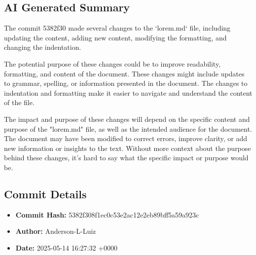 \documentclass{article}
\begin{document}
\subsection{AI Generated Summary}
{\selectfont
 The commit 5382f30 made several changes to the `lorem.md` file, including updating the content, adding new content, modifying the formatting, and changing the indentation.

The potential purpose of these changes could be to improve readability, formatting, and content of the document. These changes might include updates to grammar, spelling, or information presented in the document. The changes to indentation and formatting make it easier to navigate and understand the content of the file.

The impact and purpose of these changes will depend on the specific content and purpose of the "lorem.md" file, as well as the intended audience for the document. The document may have been modified to correct errors, improve clarity, or add new information or insights to the text. Without more context about the purpose behind these changes, it's hard to say what the specific impact or purpose would be.
}
\subsection{Commit Details}
\begin{itemize}
    \item \textbf{Commit Hash:} 5382f308f1ec0c53e2ac12e2eb89bff5a59a923c
    \item \textbf{Author:} Anderson-L-Luiz
    \item \textbf{Date:} 2025-05-14 16:27:32 +0000
\end{itemize}
\hrulefill
\end{document}
